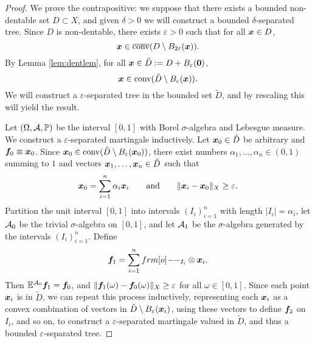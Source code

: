 \begin{proof}
  We prove the contrapositive: we suppose that there exists a bounded non-dentable set $D \subset X$, and given $\delta > 0$ we will construct a bounded $\delta$-separated tree.
  Since $D$ is non-dentable, there exists $\varepsilon > 0$ such that for all $\bm{x} \in D$,
  \begin{equation*}
    \bm{x} \in \overline{\mathrm{conv}}(D \setminus B_{2\varepsilon}(\bm{x})).
  \end{equation*}
  By Lemma \ref{lem:dentlem}, for all $\bm{x} \in \tilde{D} := D + B_{\varepsilon}(\bm{0})$,
  \begin{equation*}
    \bm{x} \in \mathrm{conv}(\tilde{D} \setminus B_{\varepsilon}(\bm{x})).
  \end{equation*}
  We will construct a $\varepsilon$-separated tree in the bounded set $\tilde{D}$, and by rescaling this will yield the result.

  Let $(\Omega,\mathcal{A},\mathbb{P})$ be the interval $[0,1]$ with Borel $\sigma$-algebra and Lebesgue measure.
  We construct a $\varepsilon$-separated martingale inductively.
  Let $\bm{x}_{0} \in \tilde{D}$ be arbitrary and $\bm{f}_0 \equiv \bm{x}_0$.
  Since $\bm{x}_0 \in \mathrm{conv}(\tilde{D} \setminus B_{\varepsilon}(\bm{x}_0))$, there exist numbers $\alpha_1,\ldots, \alpha_n \in (0,1)$ summing to $1$ and vectors $\bm{x}_{1}, \ldots, \bm{x}_{n} \in \tilde{D}$ such that
  \begin{equation*}
    \bm{x}_0 = \sum_{i=1}^{n} \alpha_{i} \bm{x}_{i} \qquad \text{and} \qquad \|\bm{x}_{i} - \bm{x}_{0}\|_X \geq \varepsilon.
  \end{equation*}
  Partition the unit interval $[0,1]$ into intervals $(I_i)_{i=1}^{n}$ with length $|I_{i}| = \alpha_{i}$, let $\mathcal{A}_{0}$ be the trivial $\sigma$-algebra on $[0,1]$, and let $\mathcal{A}_{1}$ be the $\sigma$-algebra generated by the intervals $(I_i)_{i=1}^{n}$.
  Define
  \begin{equation*}
    \mb{f}_1 = \sum_{i=1}^{n} \1_{I_i} \otimes \mb{x}_{i}.
  \end{equation*}
  Then $\mathbb{E}^{\mathcal{A}_0} \bm{f}_1 = \bm{f}_0$, and $\|\bm{f}_1(\omega) - \bm{f}_0(\omega)\|_{X} \geq \varepsilon$ for all $\omega \in [0,1]$.
  Since each point $\bm{x}_{i}$ is in $\tilde{D}$, we can repeat this process inductively, representing each $\bm{x}_{i}$ as a convex combination of vectors in $\tilde{D} \setminus B_{\varepsilon}(\bm{x}_i)$, using these vectors to define $\bm{f}_2$ on $I_{i}$, and so on, to construct a $\varepsilon$-separated martingale valued in $\tilde{D}$, and thus a bounded $\varepsilon$-separated tree.
\end{proof}

